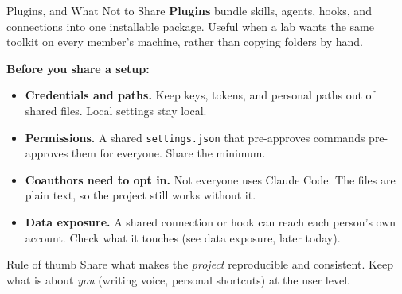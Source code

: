 \documentclass[aspectratio=169, 11pt]{beamer}
\begin{document}
\begin{frame}[shrink=8]{Plugins, and What Not to Share}
  \textbf{Plugins} bundle skills, agents, hooks, and connections into one installable package. Useful when a lab wants the same toolkit on every member's machine, rather than copying folders by hand.

  \vspace{0.6em}
  \textbf{Before you share a setup:}
  \begin{itemize}
    \item \textbf{Credentials and paths.} Keep keys, tokens, and personal paths out of shared files. Local settings stay local.
    \item \textbf{Permissions.} A shared \texttt{settings.json} that pre-approves commands pre-approves them for everyone. Share the minimum.
    \item \textbf{Coauthors need to opt in.} Not everyone uses Claude Code. The files are plain text, so the project still works without it.
    \item \textbf{Data exposure.} A shared connection or hook can reach each person's own account. Check what it touches (see data exposure, later today).
  \end{itemize}

  \vspace{0.5em}
  \begin{block}{Rule of thumb}
    Share what makes the \emph{project} reproducible and consistent. Keep what is about \emph{you} (writing voice, personal shortcuts) at the user level.
  \end{block}
\end{frame}


\end{document}
